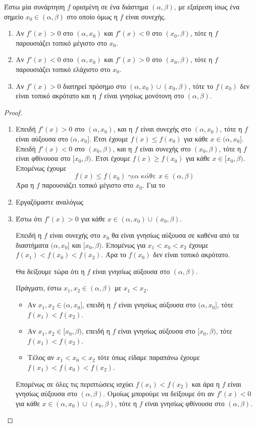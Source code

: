 \documentclass[a4paper, 12pt]{article}
\begin{document}
\begin{theorem}{}

  Έστω μία συνάρτηση $f$ ορισμένη σε ένα διάστημα $(α,β)$, με εξαίρεση ίσως ένα σημείο $x_0\in (α,β)$ στο οποίο όμως η $f$ είναι συνεχής.
  \begin{enumerate}
    \item Αν $f'(x)>0$ στο $(α,x_0)$ και $f'(x)<0$ στο $(x_0,β)$, τότε η $f$ παρουσιάζει τοπικό μέγιστο στο $x_0$.
    \item Αν $f'(x)<0$ στο $(α,x_0)$ και $f'(x)>0$ στο $(x_0,β)$, τότε η $f$ παρουσιάζει τοπικό ελάχιστο στο $x_0$.
    \item Αν $f'(x)>0$ διατηρεί πρόσημο στο $(α,x_0)\cup (x_0,β)$, τότε το $f(x_0)$ δεν είναι τοπικό ακρότατο και η $f$ είναι γνησίως μονότονη στο $(α,β)$.
  \end{enumerate}
\end{theorem}
\begin{proof}
  \begin{enumerate}
    \item   Επειδή $f'(x)>0$ στο $(α,x_0)$, και η $f$ είναι συνεχής στο $(α,x_0)$, τότε η $f$ είναι αύξουσα στο $(α,x_0]$. Έτσι έχουμε $f(x)\le f(x_0)$ για κάθε $x\in (α,x_0]$.
          Επειδή $f'(x)<0$ στο $(x_0,β)$, και η $f$ είναι συνεχής στο $(x_0,β)$, τότε η $f$ είναι φθίνουσα στο $[x_0,β)$. Έτσι έχουμε $f(x)\ge f(x_0)$ για κάθε $x\in [x_0,β)$.
          Επομένως έχουμε
          $$f(x)\le f(x_0) \text{ για κάθε } x\in (α,β)$$
          Άρα η $f$ παρουσιάζει τοπικό μέγιστο στο $x_0$.
          Για το
    \item Εργαζόμαστε αναλόγως
    \item Έστω ότι $f'(x)>0$ για κάθε $x\in (α,x_0)\cup (x_0,β)$.

          Επειδή η $f$ είναι συνεχής στο $x_0$ θα είναι γνησίως αύξουσα σε καθένα από τα διαστήματα $(α,x_0]$ και $[x_0,β)$. Επομένως για $x_1<x_0<x_2$ έχουμε $f(x_1)<f(x_0)<f(x_2)$. Άρα το $f(x_0)$ δεν είναι τοπικό ακρότατο.

          Θα δείξουμε τώρα ότι η $f$ είναι γνησίως αύξουσα στο $(α,β)$.

          Πράγματι, έστω $x_1,x_2\in (α,β)$ με $x_1<x_2$.

          \begin{itemize}
            \item Αν $x_1,x_2\in (α,x_0]$, επειδή η $f$ είναι γνησίως αύξουσα στο $(α,x_0]$, τότε $f(x_1)<f(x_2)$.
            \item Αν $x_1,x_2\in [x_0,β)$, επειδή η $f$ είναι γνησίως αύξουσα στο $[x_0,β)$, τότε $f(x_1)<f(x_2)$.
            \item Τέλος αν $x_1<x_0<x_2$ τότε όπως είδαμε παραπάνω έχουμε $f(x_1)<f(x_0)<f(x_2)$.
          \end{itemize}

          Επομένως σε όλες τις περιπτώσεις ισχύει $f(x_1)<f(x_2)$ και άρα η $f$ είναι γνησίως αύξουσα στο $(α,β)$.
          Ομοίως μπορούμε να δείξουμε ότι αν $f'(x)<0$ για κάθε $x\in (α,x_0)\cup (x_0,β)$, τότε η $f$ είναι γνησίως φθίνουσα στο $(α,β)$.
  \end{enumerate}
\end{proof}
\end{document}
